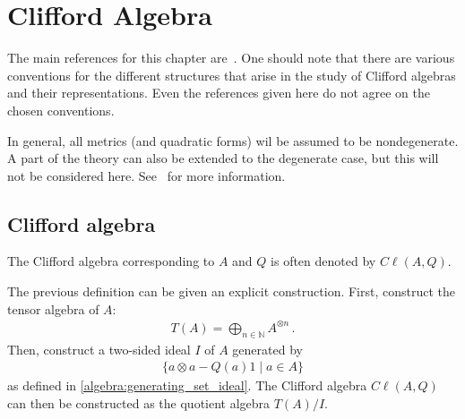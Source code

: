 \chapter{Clifford Algebra}\label{chapter:clifford}

    The main references for this chapter are~\citet{gallier_clifford_2008,choquet-bruhat_analysis_1991,choquet-bruhat_analysis_2000}. One should note that there are various conventions for the different structures that arise in the study of Clifford algebras and their representations. Even the references given here do not agree on the chosen conventions.

    In general, all metrics (and quadratic forms) wil be assumed to be nondegenerate. A part of the theory can also be extended to the degenerate case, but this will not be considered here. See~\cite{gallier_clifford_2008} for more information.

\section{Clifford algebra}

    \begin{notation}
        The Clifford algebra corresponding to $A$ and $Q$ is often denoted by $C\ell(A,Q)$.
    \end{notation}

    \begin{construct}
        The previous definition can be given an explicit construction. First, construct the tensor algebra of $A$:
        \begin{gather}
            T(A) = \bigoplus_{n\in\mathbb{N}}A^{\otimes n}\,.
        \end{gather}
        Then, construct a two-sided ideal $I$ of $A$ generated by
        \begin{gather}
            \{a\otimes a - Q(a)1\mid a\in A\}
        \end{gather}
        as defined in \cref{algebra:generating_set_ideal}. The Clifford algebra $C\ell(A,Q)$ can then be constructed as the quotient algebra $T(A)/I$.
    \end{construct}

